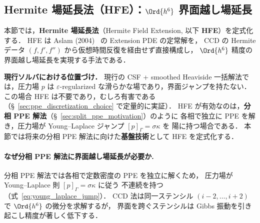 %
%
\subsection{\texorpdfstring{Hermite 場延長法（HFE）：$\Ord{h^6}$ 界面越し場延長}{Hermite 場延長法（HFE）：O(h⁶) 界面越し場延長}}
\label{sec:field_extension}
\label{sec:hfe}%
\label{sec:extension_pde}%
\label{sec:gfm}%

本節では，\textbf{Hermite 場延長法}（Hermite Field Extension, 以下 \textbf{HFE}）を定式化する．
HFE は Aslam (2004)~\cite{Aslam2004} の Extension PDE の定常解を，
CCD の Hermite データ $(f, f', f'')$ から仮想時間反復を経由せず直接構成し，
$\Ord{h^6}$ 精度の界面越し場延長を実現する手法である．

\noindent\textbf{現行ソルバにおける位置づけ．}
現行の CSF + smoothed Heaviside 一括解法では，圧力場 $p$ は
$\varepsilon$-regularized な滑らかな場であり，界面ジャンプを持たない．
この場合 HFE は不要であり，むしろ有害である
（§~\ref{sec:ppe_discretization_choice} で定量的に実証）．
HFE が有効なのは，\textbf{分相 PPE 解法}（§~\ref{sec:split_ppe_motivation}）のように
各相で独立に PPE を解き，圧力場が Young--Laplace ジャンプ $[p]_\Gamma = \sigma\kappa$ を
陽に持つ場合である．
本節では将来の分相 PPE 解法に向けた\textbf{基盤技術}として HFE を定式化する．

\paragraph{なぜ分相 PPE 解法に界面越し場延長が必要か.}
分相 PPE 解法では各相で定数密度の PPE を独立に解くため，
圧力場が Young--Laplace 則 $[p]_\Gamma = \sigma\kappa$ に従う
不連続を持つ（式~\eqref{eq:young_laplace_jump}）．
CCD 法は同一ステンシル $(i-2,\ldots,i+2)$ で $\Ord{h^6}$ の微分を求解するが，
界面を跨ぐステンシルは Gibbs 振動を引き起こし精度が著しく低下する．

